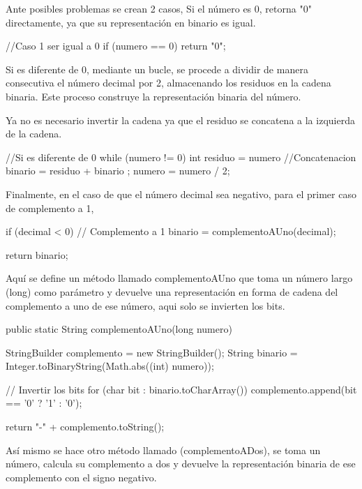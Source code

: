 \documentclass{IEEEcsmag}
\begin{document}
Ante posibles problemas se crean 2 casos,
Si el número es 0, retorna "0" directamente, ya que su representación en binario es igual.

\begin{javaCode}
    //Caso 1 ser igual a 0
    if (numero == 0) {
        return "0";
    }
\end{javaCode}

Si es diferente de 0, mediante un bucle, se procede a dividir de manera consecutiva el número decimal por 2, almacenando los residuos en la cadena binaria. Este proceso construye la representación binaria del número.

Ya no es necesario invertir la cadena ya que el residuo se concatena a la izquierda de la cadena.

\begin{javaCode}
    //Si es diferente de 0 
    while (numero != 0) {
        int residuo = numero %
        //Concatenacion 
        binario = residuo + binario ; 
        numero = numero / 2;
    }
\end{javaCode}

Finalmente, en el caso de que el número decimal sea negativo, para el primer caso de complemento a 1, 

\begin{javaCode}
      if (decimal < 0) {
            // Complemento a 1
            binario = complementoAUno(decimal);
        }

    return binario;
\end{javaCode}

Aquí se define un método llamado complementoAUno que toma un número largo (long) como parámetro y devuelve una representación en forma de cadena del complemento a uno de ese número, aqui solo se invierten los bits.

\begin{javaCode}
        public static String complementoAUno(long numero) {
        StringBuilder complemento = new StringBuilder();
        String binario = Integer.toBinaryString(Math.abs((int) numero));

        // Invertir los bits
        for (char bit : binario.toCharArray()) {
            complemento.append(bit == '0' ? '1' : '0');
        }

        return "-" + complemento.toString();
    }


\end{javaCode}

Así mismo se hace otro método llamado (complementoADos), se toma un número, calcula su complemento a dos y devuelve la representación binaria de ese complemento con el signo negativo.
\end{document}
